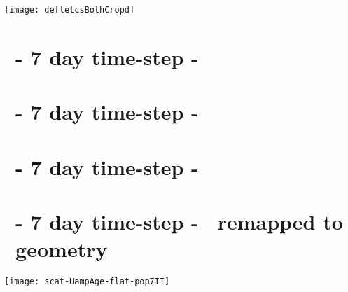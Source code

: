 \label{chap:results}

\begin{figure*}
	\texttt{[image: defletcsBothCropd]}
	\caption[\popSevenII tracks.]{Baseline-shifted tracks. Left: anticyclones. Right: cyclones. Color represents \textit{birth}-latitude. Thickness (hardly noticable) represents $\IQ$. Data is from a predecessor run to \popSevenII.}
	\label{fig:defletcsBothCropd}
\end{figure*}





\section{\mi~- 7 day time-step - \avi}
\label{section:aviI}


\section{\mii~- 7 day time-step - \avi}
\label{section:aviII}


\section{\mii~- 7 day time-step - \pop}
\label{section:pop7II}


\section{\mii~- 7 day time-step - \pop~remapped to \avi~geometry}
\label{section:p2aII}


\begin{marginfigure}
		\texttt{[image: scat-UampAge-flat-pop7II]}
		\caption{\RUN Small amplitude correlates with a short life and a broad translational speed spectrum. y-axis: translational speed $[cm/s]$, x-axis: amplitude $[cm]$, color: age [months] }
		\label{fig:scat-UampAge-flat-pop7II}
\end{marginfigure}


